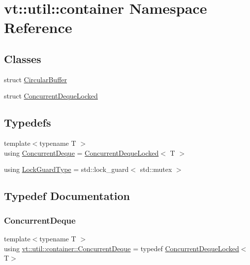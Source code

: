 \hypertarget{namespacevt_1_1util_1_1container}{}\section{vt\+:\+:util\+:\+:container Namespace Reference}
\label{namespacevt_1_1util_1_1container}
\subsection*{Classes}
\begin{DoxyCompactItemize}
\item 
struct \hyperlink{structvt_1_1util_1_1container_1_1_circular_buffer}{Circular\+Buffer}
\item 
struct \hyperlink{structvt_1_1util_1_1container_1_1_concurrent_deque_locked}{Concurrent\+Deque\+Locked}
\end{DoxyCompactItemize}
\subsection*{Typedefs}
\begin{DoxyCompactItemize}
\item 
{\footnotesize template$<$typename T $>$ }\\using \hyperlink{namespacevt_1_1util_1_1container_a495a137e297e892f4e474d4aaad77c8a}{Concurrent\+Deque} = \hyperlink{structvt_1_1util_1_1container_1_1_concurrent_deque_locked}{Concurrent\+Deque\+Locked}$<$ T $>$
\item 
using \hyperlink{namespacevt_1_1util_1_1container_a3a15245f8cecaa98c5761db2ccfa7301}{Lock\+Guard\+Type} = std\+::lock\+\_\+guard$<$ std\+::mutex $>$
\end{DoxyCompactItemize}


\subsection{Typedef Documentation}
\mbox{\label{namespacevt_1_1util_1_1container_a495a137e297e892f4e474d4aaad77c8a}} 
\subsubsection{\texorpdfstring{Concurrent\+Deque}{ConcurrentDeque}}
{\footnotesize\ttfamily template$<$typename T $>$ \\
using \hyperlink{namespacevt_1_1util_1_1container_a495a137e297e892f4e474d4aaad77c8a}{vt\+::util\+::container\+::\+Concurrent\+Deque} = typedef \hyperlink{structvt_1_1util_1_1container_1_1_concurrent_deque_locked}{Concurrent\+Deque\+Locked}$<$T$>$}

